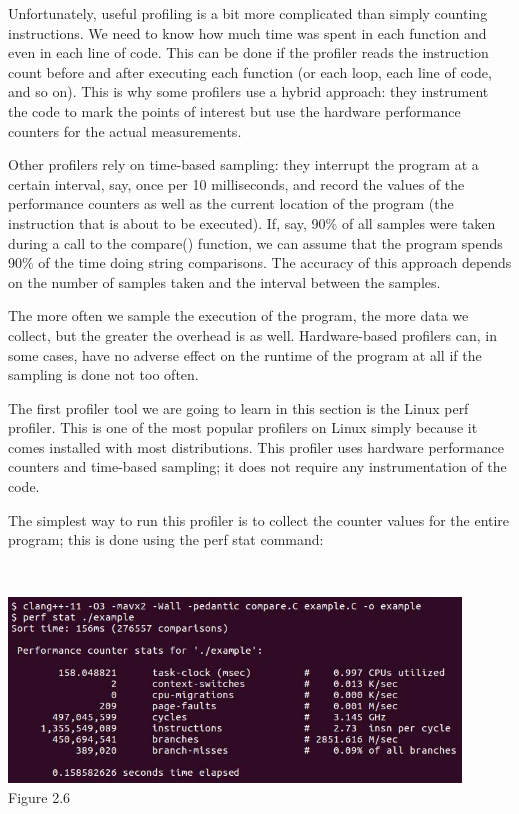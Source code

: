 Unfortunately, useful profiling is a bit more complicated than simply counting instructions. We need to know how much time was spent in each function and even in each line of code. This can be done if the profiler reads the instruction count before and after executing each function (or each loop, each line of code, and so on). This is why some profilers use a hybrid approach: they instrument the code to mark the points of interest but use the hardware performance counters for the actual measurements.

Other profilers rely on time-based sampling: they interrupt the program at a certain interval, say, once per 10 milliseconds, and record the values of the performance counters as well as the current location of the program (the instruction that is about to be executed). If, say, 90\% of all samples were taken during a call to the compare() function, we can assume that the program spends 90\% of the time doing string comparisons. The accuracy of this approach depends on the number of samples taken and the interval between the samples.

The more often we sample the execution of the program, the more data we collect, but the greater the overhead is as well. Hardware-based profilers can, in some cases, have no adverse effect on the runtime of the program at all if the sampling is done not too often.


The first profiler tool we are going to learn in this section is the Linux perf profiler. This is one of the most popular profilers on Linux simply because it comes installed with most distributions. This profiler uses hardware performance counters and time-based sampling; it does not require any instrumentation of the code. 

The simplest way to run this profiler is to collect the counter values for the entire program; this is done using the perf stat command:

\hspace*{\fill} \\ %
\begin{center}
\includegraphics[width=0.9\textwidth]{content/1/chapter2/images/6.jpg}\\
Figure 2.6
\end{center}

